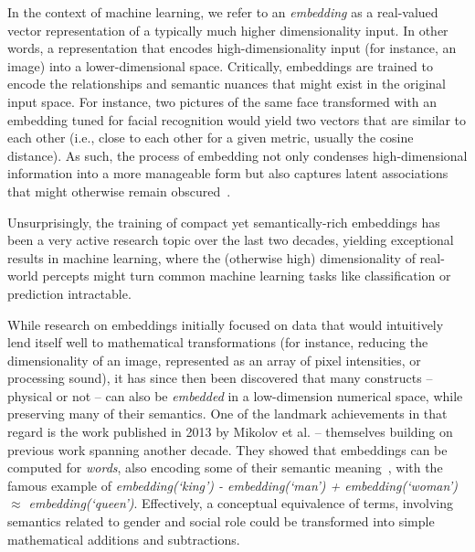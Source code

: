 In the context of machine learning, we refer to an \emph{embedding} as a
real-valued vector representation of a typically much higher dimensionality
input. In other words, a representation that encodes high-dimensionality input
(for instance, an image) into a lower-dimensional space. Critically, embeddings
are trained to encode the relationships and semantic nuances that might exist in
the original input space. For instance, two pictures of the same face
transformed with an embedding tuned for facial recognition would yield two
vectors that are similar to each other (i.e., close to each other for a given
metric, usually the cosine distance). As such, the process of embedding not only
condenses high-dimensional information into a more manageable form but also
captures latent associations that might otherwise remain
obscured~\cite{bengio2009learning}.

Unsurprisingly, the training of compact yet semantically-rich embeddings has
been a very active research topic over the last two decades, yielding
exceptional results in machine learning, where the (otherwise high)
dimensionality of real-world percepts might turn common machine learning
tasks like classification or prediction intractable.

While research on embeddings initially focused on data that would intuitively
lend itself well to mathematical transformations (for instance, reducing the
dimensionality of an image, represented as an array of pixel intensities, or
processing sound), it has since then been discovered that many constructs --
physical or not -- can also be \emph{embedded} in a low-dimension numerical
space, while preserving many of their semantics. One of the landmark
achievements in that regard is the work published in 2013 by Mikolov et al. --
themselves building on previous work spanning another decade.  They showed that
embeddings can be computed for \emph{words}, also encoding some of their
semantic meaning~\cite{mikolov2013efficient}, with the famous example of
\emph{embedding(`king') - embedding(`man') + embedding(`woman') $\approx$
embedding(`queen')}. Effectively, a conceptual equivalence of terms, involving
semantics related to gender and social role could be transformed into simple
mathematical additions and subtractions.

